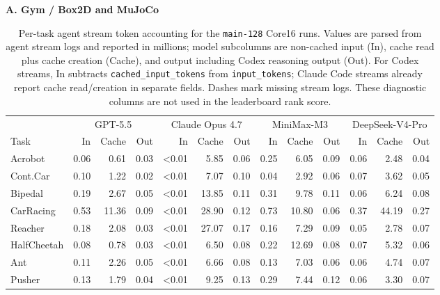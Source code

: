 \begin{table}[t]
\caption{Per-task agent stream token accounting for the \texttt{main-128}
Core16 runs. Values are parsed from agent stream logs and reported in millions;
model subcolumns are non-cached input (In), cache read plus cache creation
(Cache), and output including Codex reasoning output (Out). For Codex streams,
In subtracts \texttt{cached\_input\_tokens} from \texttt{input\_tokens};
Claude Code streams already report cache read/creation in separate fields.
Dashes mark missing stream logs. These diagnostic columns are not used in the
leaderboard rank score.}
\label{tab:token-accounting}
\begin{center}
\scriptsize
\setlength{\tabcolsep}{1.8pt}
\textbf{A. Gym / Box2D and MuJoCo}\par\vspace{0.25em}
\begin{tabular}{@{}l*{4}{rrr}@{}}
\toprule
 & \multicolumn{3}{c}{GPT-5.5} & \multicolumn{3}{c}{Claude Opus 4.7}
 & \multicolumn{3}{c}{MiniMax-M3} & \multicolumn{3}{c}{DeepSeek-V4-Pro} \\
\cmidrule(lr){2-4}\cmidrule(lr){5-7}\cmidrule(lr){8-10}\cmidrule(lr){11-13}
Task & In & Cache & Out & In & Cache & Out & In & Cache & Out & In & Cache & Out \\
\midrule
Acrobot & 0.06 & 0.61 & 0.03 & \textless{}0.01 & 5.85 & 0.06 & 0.25 & 6.05 & 0.09 & 0.06 & 2.48 & 0.04 \\
Cont.Car & 0.10 & 1.22 & 0.02 & \textless{}0.01 & 7.07 & 0.10 & 0.04 & 2.92 & 0.06 & 0.07 & 3.62 & 0.05 \\
Bipedal & 0.19 & 2.67 & 0.05 & \textless{}0.01 & 13.85 & 0.11 & 0.31 & 9.78 & 0.11 & 0.06 & 6.24 & 0.08 \\
CarRacing & 0.53 & 11.36 & 0.09 & \textless{}0.01 & 28.90 & 0.12 & 0.73 & 10.80 & 0.06 & 0.37 & 44.19 & 0.27 \\
Reacher & 0.18 & 2.08 & 0.03 & \textless{}0.01 & 27.07 & 0.17 & 0.16 & 7.29 & 0.09 & 0.05 & 2.78 & 0.07 \\
HalfCheetah & 0.08 & 0.78 & 0.03 & \textless{}0.01 & 6.50 & 0.08 & 0.22 & 12.69 & 0.08 & 0.07 & 5.32 & 0.06 \\
Ant & 0.11 & 2.26 & 0.05 & \textless{}0.01 & 6.66 & 0.08 & 0.13 & 7.03 & 0.06 & 0.06 & 4.74 & 0.07 \\
Pusher & 0.13 & 1.79 & 0.04 & \textless{}0.01 & 9.25 & 0.13 & 0.29 & 7.44 & 0.12 & 0.06 & 3.30 & 0.07 \\
\bottomrule
\end{tabular}


\end{center}
\end{table}
